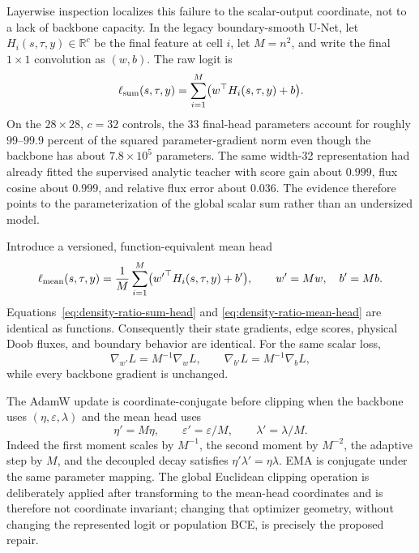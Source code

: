 \documentclass[11pt]{article}
\numberwithin{equation}{section}
\newcommand{\R}{\mathbb R}
\newcommand{\1}{\mathbf 1}
\begin{document}
Layerwise inspection localizes this failure to the scalar-output coordinate,
not to a lack of backbone capacity.  In the legacy boundary-smooth U-Net, let
\(H_i(s,\tau,y)\in\R^c\) be the final feature at cell \(i\), let \(M=n^2\), and
write the final \(1\mathbin{\times}1\) convolution as \((w,b)\).  The raw logit
is
\begin{equation}\label{eq:density-ratio-sum-head}
  \ell_{\rm sum}(s,\tau,y)
  =\sum_{i=1}^{M}\bigl(w^\top H_i(s,\tau,y)+b\bigr).
\end{equation}
On the \(28\times28\), \(c=32\) controls, the \(33\) final-head parameters
account for roughly \(99\)--\(99.9\) percent of the squared parameter-gradient
norm even though the backbone has about \(7.8\times10^5\) parameters.  The
same width-32 representation had already fitted the supervised analytic
teacher with score gain about \(0.999\), flux cosine about \(0.999\), and
relative flux error about \(0.036\).  The evidence therefore points to the
parameterization of the global scalar sum rather than an undersized model.

Introduce a versioned, function-equivalent mean head
\begin{equation}\label{eq:density-ratio-mean-head}
  \ell_{\rm mean}(s,\tau,y)
  =\frac1M\sum_{i=1}^{M}
       \bigl({w'}^\top H_i(s,\tau,y)+b'\bigr),
  \qquad w'=Mw,\quad b'=Mb.
\end{equation}
Equations~\eqref{eq:density-ratio-sum-head} and
\eqref{eq:density-ratio-mean-head} are identical as functions.  Consequently
their state gradients, edge scores, physical Doob fluxes, and boundary
behavior are identical.  For the same scalar loss,
\[
  \nabla_{w'}L=M^{-1}\nabla_wL,
  \qquad
  \nabla_{b'}L=M^{-1}\nabla_bL,
\]
while every backbone gradient is unchanged.

The AdamW update is coordinate-conjugate before clipping when the backbone
uses \((\eta,\varepsilon,\lambda)\) and the mean head uses
\begin{equation}\label{eq:density-ratio-head-adamw}
  \eta'=M\eta,
  \qquad \varepsilon'=\varepsilon/M,
  \qquad \lambda'=\lambda/M.
\end{equation}
Indeed the first moment scales by \(M^{-1}\), the second moment by \(M^{-2}\),
the adaptive step by \(M\), and the decoupled decay satisfies
\(\eta'\lambda'=\eta\lambda\).  EMA is conjugate under the same parameter
mapping.  The global Euclidean clipping operation is deliberately applied
after transforming to the mean-head coordinates and is therefore not
coordinate invariant; changing that optimizer geometry, without changing the
represented logit or population BCE, is precisely the proposed repair.
\end{document}

